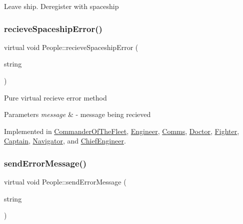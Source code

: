 Leave ship. Deregister with spaceship \mbox{\label{classPeople_a0685df78be631783138865e03cc7c85d}} 
\subsubsection{\texorpdfstring{recieve\+Spaceship\+Error()}{recieveSpaceshipError()}}
{\footnotesize\ttfamily virtual void People\+::recieve\+Spaceship\+Error (\begin{DoxyParamCaption}\item[{string}]{ }\end{DoxyParamCaption})\hspace{0.3cm}{\ttfamily [pure virtual]}}

Pure virtual recieve error method 
\begin{DoxyParams}{Parameters}
{\em message} & -\/ message being recieved \\
\hline
\end{DoxyParams}


Implemented in \hyperlink{classCommanderOfTheFleet_a13e91b9342df067b375f7ef2b929c0d5}{Commander\+Of\+The\+Fleet}, \hyperlink{classEngineer_acc86ce6b4b1388be8ebacc685f9e6233}{Engineer}, \hyperlink{classComms_a1aed1c01a813afd55309fdc59d2871bf}{Comms}, \hyperlink{classDoctor_a820dca3b9f05d3f69c47bd7318923b88}{Doctor}, \hyperlink{classFighter_aecd2761c68aed8499e210fd0ca11c447}{Fighter}, \hyperlink{classCaptain_a39ebd40ec094b410f295188bb6262009}{Captain}, \hyperlink{classNavigator_a7dc06965001f658cff3c5f0dcac39def}{Navigator}, and \hyperlink{classChiefEngineer_a7170ae93d7eadc1a68bc86c25a9be0db}{Chief\+Engineer}.

\mbox{\label{classPeople_a572a35170f61d1848eb04b65baafb057}} 
\subsubsection{\texorpdfstring{send\+Error\+Message()}{sendErrorMessage()}}
{\footnotesize\ttfamily virtual void People\+::send\+Error\+Message (\begin{DoxyParamCaption}\item[{string}]{ }\end{DoxyParamCaption})\hspace{0.3cm}{\ttfamily [pure virtual]}}


